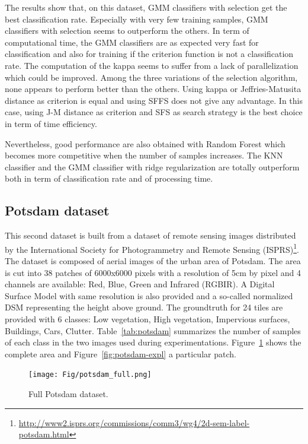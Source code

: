 \documentclass[journal,peerreview,onecolumn]{IEEEtran}
\begin{document}
    The results show that, on this dataset, GMM classifiers with selection get the best classification rate. Especially with very few training samples, GMM classifiers with selection seems to outperform the others. In term of computational time, the GMM classifiers are as expected very fast for classification and also for training if the criterion function is not a classification rate. The computation of the kappa seems to suffer from a lack of parallelization which could be improved. Among the three variations of the selection algorithm, none appears to perform better than the others. Using kappa or Jeffries-Matusita distance as criterion is equal and using SFFS does not give any advantage. In this case, using J-M distance as criterion and SFS as search strategy is the best choice in term of time efficiency.

    Nevertheless, good performance are also obtained with Random Forest which becomes more competitive when the number of samples increases.
    The KNN classifier and the GMM classifier with ridge regularization are totally outperform both in term of classification rate and of processing time.

    \subsection{Potsdam dataset}

    This second dataset is built from a dataset of remote sensing images distributed by the International Society for Photogrammetry and Remote Sensing (ISPRS)\footnote{\url{http://www2.isprs.org/commissions/comm3/wg4/2d-sem-label-potsdam.html}}. The dataset is composed of aerial images of the urban area of Potsdam. The area is cut into 38 patches of 6000x6000 pixels with a resolution of 5cm by pixel and 4 channels are available: Red, Blue, Green and Infrared (RGBIR). A Digital Surface Model with same resolution is also provided and a so-called normalized DSM representing the height above ground. The groundtruth for 24 tiles are provided with 6 classes: Low vegetation, High vegetation, Impervious surfaces, Buildings, Cars, Clutter. Table~\ref{tab:potsdam} summarizes the number of samples of each class in the two images used during experimentations. Figure~\ref{fig:potsdam-dataset} shows the complete area and Figure~\ref{fig:potsdam-expl} a particular patch.

    \begin{figure}[!t]
        \centering
        \texttt{[image: Fig/potsdam\_full.png]}
        \caption{Full Potsdam dataset.\label{fig:potsdam-dataset}}
    \end{figure}
\end{document}
